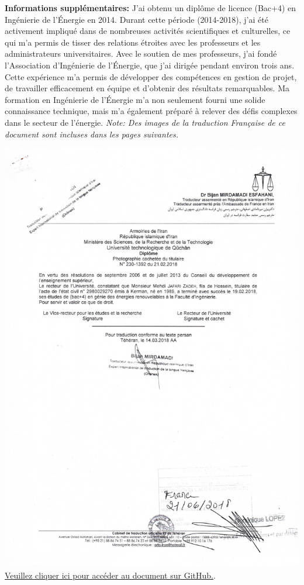 \documentclass{article}
\begin{document}
\par\textbf{Informations supplémentaires:} J'ai obtenu un diplôme de licence (Bac+4) en Ingénierie de l'Énergie en 2014. Durant cette période (2014-2018), j'ai été activement impliqué dans de nombreuses activités scientifiques et culturelles, ce qui m'a permis de tisser des relations étroites avec les professeurs et les administrateurs universitaires. Avec le soutien de mes professeurs, j'ai fondé l'Association d'Ingénierie de l'Énergie, que j'ai dirigée pendant environ trois ans. Cette expérience m'a permis de développer des compétences en gestion de projet, de travailler efficacement en équipe et d'obtenir des résultats remarquables. Ma formation en Ingénierie de l'Énergie m'a non seulement fourni une solide connaissance technique, mais m'a également préparé à relever des défis complexes dans le secteur de l'énergie.
\newline
\newline
\textit {Note: Des images de la traduction Française de ce document sont incluses dans les pages suivantes.}

\newpage
    \begin{center}
        \includegraphics[width=\textwidth,height=\textheight,keepaspectratio]{../Document/Education/Renewable Energy Engineering/21-02-2018 diplôme - Génie énergétique.jpg}
        \footnotesize
         \href{https://github.com/jafarizadeh/CV---lettre/tree/079f60796b41475881d7ba4a70abc3254d3dd466/Document/Education/Renewable%20Energy%20Engineering}{Veuillez cliquer ici pour accéder au document sur GitHub.}.
    \end{center}
    
\end{document}

